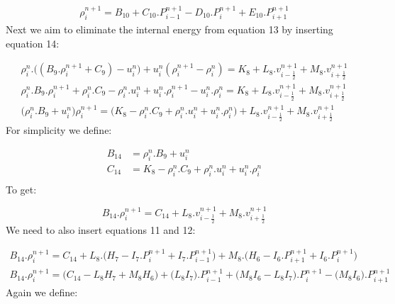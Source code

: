 \documentclass[11pt,letterpaper,titlepage]{article}
\newcommand{\half}{\frac{1}{2}}
\begin{document}
\begin{equation}
\begin{aligned}
\rho_i^{n+1}=B_{10} + C_{10}. P_{i-1}^{n+1} - D_{10}. P_{i}^{n+1}+ E_{10}. P_{i+1}^{n+1}
\end{aligned}
\end{equation}
\newline
Next we aim to eliminate the internal energy from equation 13 by inserting equation 14:

\begin{equation*}
\begin{aligned}
\rho_i^{n}.\biggr((B_9.\rho_{i}^{n+1}+C_9)-u_i^{n} \biggr) + u_i^{n}(\rho_i^{n+1}-\rho_i^{n})=K_8+L_8.v_{i-\half}^{n+1}+M_8.v_{i+\half}^{n+1} \\
\rho_i^{n}.B_9.\rho_{i}^{n+1}+\rho_i^{n}.C_9-\rho_i^{n}.u_i^n +u_i^n.\rho_{i}^{n+1} - u_i^n.\rho_{i}^{n}=K_8+L_8.v_{i-\half}^{n+1}+M_8.v_{i+\half}^{n+1} \\
\biggr(\rho_i^{n}.B_9+u_i^n\biggr)\rho_{i}^{n+1} = \biggr( K_8 -\rho_i^{n}.C_9+\rho_i^{n}.u_i^n +u_i^n.\rho_{i}^{n} \biggr)+L_8.v_{i-\half}^{n+1}+M_8.v_{i+\half}^{n+1}
\end{aligned}
\end{equation*}
\newline
For simplicity we define:

\begin{equation*}
\begin{aligned}
B_{14} &=  \rho_i^{n}.B_9+u_i^n \\
C_{14} &=   K_8 -\rho_i^{n}.C_9+\rho_i^{n}.u_i^n +u_i^n.\rho_{i}^{n}  \\
\end{aligned}
\end{equation*}
\newline
To get:

\begin{equation*}
B_{14}.\rho_{i}^{n+1}=C_{14}+L_8.v_{i-\half}^{n+1}+M_8.v_{i+\half}^{n+1}
\end{equation*}
\newline
We need to also insert equations 11 and 12:

\begin{equation*}
\begin{aligned}
B_{14}.\rho_{i}^{n+1}=C_{14}+L_8.\biggr( H_7-I_7.P_{i}^{n+1}+I_7.P_{i-1}^{n+1}  \biggr)+M_8.\biggr( H_6-I_6.P_{i+1}^{n+1}+I_6.P_{i}^{n+1}   \biggr) \\
B_{14}.\rho_{i}^{n+1}=\biggr( C_{14}-L_8 H_7 +M_8 H_6 \biggr) + \biggr( L_8 I_7 \biggr).P_{i-1}^{n+1} + \biggr(M_8 I_6-L_8 I_7   \biggr).P_{i}^{n+1} - \biggr( M_8 I_6 \biggr).P_{i+1}^{n+1}
\end{aligned}
\end{equation*}
\newline
Again we define:
\end{document}
